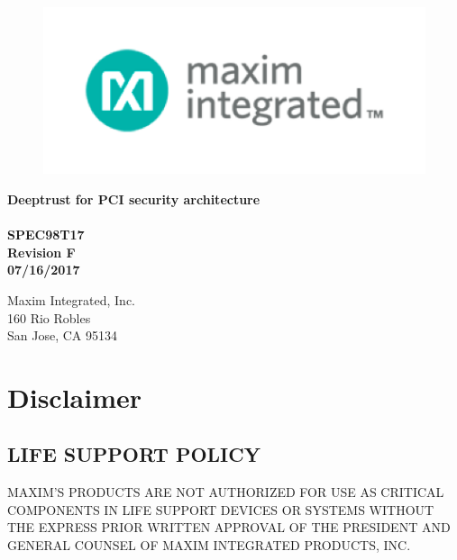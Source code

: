 \documentclass[twoside]{book}
\newcommand\docrev{Revision F }
\newcommand\docref{SPEC98T17 }
\newcommand\docdate{07/16/2017 }
\newcommand{\+}{\discretionary{\mbox{\scriptsize$\hookleftarrow$}}{}{}}
\begin{document}
\hypersetup{pageanchor=false,
             bookmarksnumbered=true,
             pdfencoding=unicode
            }
\begin{titlepage}
\vspace*{7cm}
\begin{flushleft}
\begin{figure}[H]
\includegraphics[scale=1]{../../res/maxim-logo-header.png}
\end{figure}
\textbf{\Large{\bf{Deeptrust for P\+C\+I security architecture}\\}}
\textbf{\\\docref\\}
\textbf{\docrev\\}
\textbf{\docdate\\}
\end{flushleft}

\vspace*{7cm}
\begin{flushright}
Maxim Integrated, Inc.\\
160 Rio Robles\\
San Jose, CA 95134\\
\end{flushright}

\end{titlepage}

\section*{Disclaimer}

\subsection*{LIFE SUPPORT POLICY}
MAXIM’S PRODUCTS ARE NOT AUTHORIZED FOR USE AS CRITICAL COMPONENTS IN LIFE SUPPORT DEVICES OR SYSTEMS WITHOUT THE EXPRESS PRIOR WRITTEN APPROVAL OF THE PRESIDENT AND GENERAL COUNSEL OF MAXIM INTEGRATED PRODUCTS, INC. 
\end{document}
